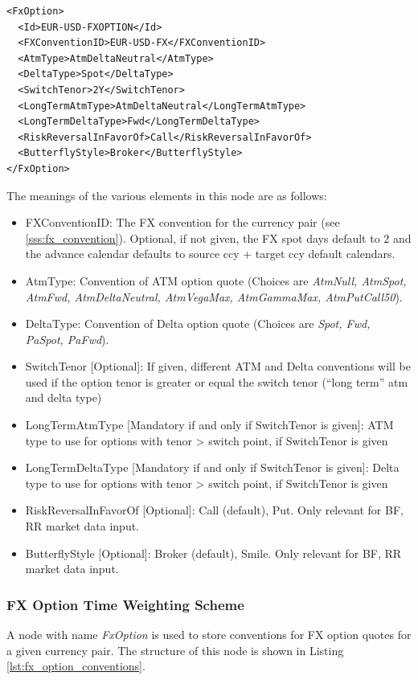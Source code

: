 \begin{listing}[H]
\begin{verbatim}
<FxOption>
  <Id>EUR-USD-FXOPTION</Id>
  <FXConventionID>EUR-USD-FX</FXConventionID>
  <AtmType>AtmDeltaNeutral</AtmType>
  <DeltaType>Spot</DeltaType>
  <SwitchTenor>2Y</SwitchTenor>
  <LongTermAtmType>AtmDeltaNeutral</LongTermAtmType>
  <LongTermDeltaType>Fwd</LongTermDeltaType>
  <RiskReversalInFavorOf>Call</RiskReversalInFavorOf>
  <ButterflyStyle>Broker</ButterflyStyle>
</FxOption>
\end{verbatim}
\caption{FX option conventions}
\label{lst:fx_option_conventions}
\end{listing}


The meanings of the various elements in this node are as follows:
\begin{itemize}
\item FXConventionID: The FX convention for the currency pair (see \ref{sss:fx_convention}). Optional, if not given, the
  FX spot days default to $2$ and the advance calendar defaults to source ccy + target ccy default calendars.
\item AtmType: Convention of ATM option quote (Choices are {\em AtmNull, AtmSpot, AtmFwd,
AtmDeltaNeutral, AtmVegaMax, AtmGammaMax, AtmPutCall50}).
\item DeltaType: Convention of Delta option quote (Choices are {\em Spot, Fwd, PaSpot,
    PaFwd}).
\item SwitchTenor [Optional]: If given, different ATM and Delta conventions will be used if the option tenor is greater
  or equal the switch tenor (``long term'' atm and delta type)
\item LongTermAtmType [Mandatory if and only if SwitchTenor is given]: ATM type to use for options with tenor > switch
  point, if SwitchTenor is given
\item LongTermDeltaType [Mandatory if and only if SwitchTenor is given]: Delta type to use for options with tenor >
  switch point, if SwitchTenor is given
\item RiskReversalInFavorOf [Optional]: Call (default), Put. Only relevant for BF, RR market data input.
\item ButterflyStyle [Optional]: Broker (default), Smile. Only relevant for BF, RR market data input.
\end{itemize}

\subsubsection{FX Option Time Weighting Scheme}\label{sss:fx_option_timeweighting}
A node with name \emph{FxOption} is used to store conventions for FX option quotes for a given currency pair. The
structure of this node is shown in Listing \ref{lst:fx_option_conventions}.

